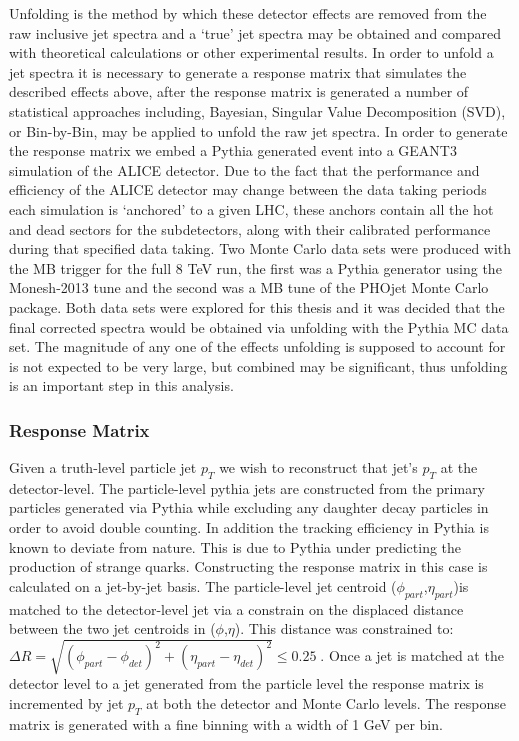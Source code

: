 \noindent
Unfolding is the method by which these detector effects are removed from the raw inclusive jet spectra and a `true' jet spectra may be obtained and compared with theoretical calculations or other experimental results.  In order to unfold a jet spectra it is necessary to generate a response matrix that simulates the described effects above, after the response matrix is generated a number of statistical approaches including, Bayesian, Singular Value Decomposition (SVD), or Bin-by-Bin, may be applied to unfold the raw jet spectra.  In order to generate the response matrix we embed a Pythia generated event into a GEANT3 simulation of the ALICE detector.  Due to the fact that the performance and efficiency of the ALICE detector may change between the data taking periods each simulation is `anchored' to a given LHC, these anchors contain all the hot and dead sectors for the subdetectors, along with their calibrated performance during that specified data taking.  Two Monte Carlo data sets were produced with the MB trigger for the full 8 TeV run, the first was a Pythia generator using the Monesh-2013 tune and the second was a MB tune of the PHOjet Monte Carlo package.  Both data sets were explored for this thesis and it was decided that the final corrected spectra would be obtained via unfolding with the Pythia MC data set.  The magnitude of any one of the effects unfolding is supposed to account for is not expected to be very large, but combined may be significant, thus unfolding is an important step in this analysis.

\subsubsection{Response Matrix}
Given a truth-level particle jet $p_{T}$ we wish to reconstruct that jet's $p_{T}$ at the detector-level.  The particle-level pythia jets are constructed from the primary particles generated via Pythia while excluding any daughter decay particles in order to avoid double counting.  In addition the tracking efficiency in Pythia is known to deviate from nature.  This is due to Pythia under predicting the production of strange quarks.  
Constructing the response matrix in this case is calculated on a jet-by-jet basis.  The particle-level jet centroid ($\phi_{part}$,$\eta_{part}$)is matched to the detector-level jet via a constrain on the displaced distance between the two jet centroids in ($\phi$,$\eta$).  This distance was constrained to: $\Delta  R = \sqrt{(\phi_{part} - \phi_{det})^{2} + (\eta_{part} - \eta_{det})^{2}} \leq 0.25 \; $.  Once a jet is matched at the detector level to a jet generated from the particle level the response matrix is incremented by jet $p_{T}$ at both the detector and Monte Carlo levels.  The response matrix is generated with a fine binning with a width of 1 GeV per bin. 


